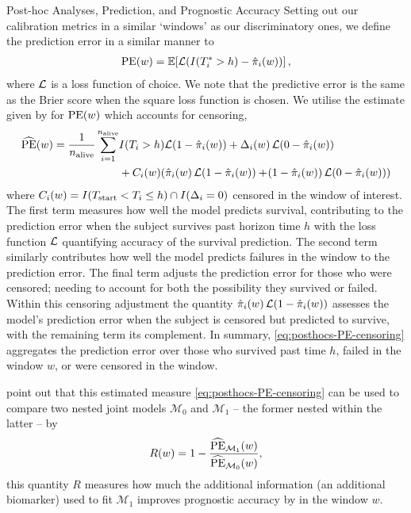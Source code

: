 \begin{chapter}{\label{cha:posthoc}Post-hoc Analyses, Prediction, and Prognostic Accuracy}
Setting out our calibration metrics in a similar `windows' as our discriminatory ones, we define the prediction error in a similar manner to \eg \citet{Rizopoulos2017}
\begin{align}
    \mathrm{PE}\!\left( w\right) = \operatorname{\mathbb{E}}\!\left[\mathcal{L}\!\left( I\!\left( T_i^*>h\right) - \hat{\pi}_i\!\left( w\right)\right)\right],
\end{align}
where $\cal L$ is a loss function of choice. We note that the predictive error is the same as the Brier score when the square loss function is chosen. We utilise the estimate given by \citet{Henderson2002} for $\mathrm{PE}\!\left( w\right)$ which accounts for censoring,
\begin{equation}
    \begin{aligned}
        \widehat{\mathrm{PE}}\lb w\rb = \frac{1}{\nalive}\sum_{i=1}^{\nalive}&I(T_i>h)\cL\lb1-\hpw\rb 
        + \Delta_i\lb w\rb\cL\lb0-\hpw\rb \\&+ C_i\lb w\rb\lb\hpw\cL\lb1-\hpw\rb+\lb1-\hpw\rb\cL\lb0-\hpw\rb\rb
    \end{aligned}
\label{eq:posthocs-PE-censoring}
\end{equation}
where $C_i\!\left( w\right)=I\!\left(T_{\mathrm{start}}<T_i\le h\right)\cap I(\Delta_i=0)$ \ie censored in the window of interest. The first term measures how well the model predicts survival, contributing to the prediction error when the subject survives past horizon time $h$ with the loss function $\mathcal{L}$ quantifying accuracy of the survival prediction. The second term similarly contributes how well the model predicts failures in the window to the prediction error. The final term adjusts the prediction error for those who were censored; needing to account for both the possibility they survived or failed. Within this censoring adjustment the quantity $\hat{\pi}_i\!\left( w\right)\mathcal{L}\!\left(1-\hat{\pi}_i\!\left( w\right)\right)$ assesses the model's prediction error when the subject is censored but predicted to survive, with the remaining term its complement. In summary, \eqref{eq:posthocs-PE-censoring} aggregates the prediction error over those who survived past time $h$, failed in the window $w$, or were censored in the window. 

\citet{Rizopoulos2017} point out that this estimated measure \eqref{eq:posthocs-PE-censoring} can be used to compare two nested joint models $\mathcal{M}_0$ and $\mathcal{M}_1$ -- the former nested within the latter -- by 
\begin{equation}
    R\!\left( w\right) = 1 - \frac{\widehat{\mathrm{PE}}_{\mathcal{M}_1}\!\left( w\right)}{\widehat{\mathrm{PE}}_{\mathcal{M}_0}\!\left( w\right)},
\label{eq:posthocs-Rvalue}
\end{equation}
this quantity $R$ measures how much the additional information (\eg an additional biomarker) used to fit $\mathcal{M}_1$ improves prognostic accuracy by in the window $w$.


\end{chapter}
